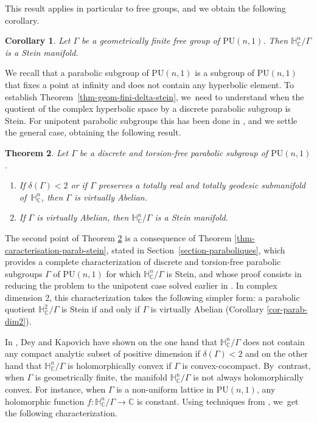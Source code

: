 \documentclass[JEP,XML,SOM,Unicode,NoEqCountersInSection,published]{cedram}
\newenvironment{enumeratea}
{\bgroup\def\theenumi{\alph{enumi}}
\begin{enumerate}}
{\end{enumerate}\egroup}
\newtheorem{theoremIntro}{Theorem}
\newtheorem{corollaryIntro}[theoremIntro]{Corollary}
\theoremstyle{definition}
\newcommand{\C}{\mathbb{C}}
\newcommand{\HNC}{\mathbb{H}^{n}_{\C}}
\newcommand{\PU}{\mathrm{PU}}
\def\C{\mathbb{C}}
\newcommand{\HNC}{\mathbb{H}^{n}_{\C}}
\newcommand{\PU}{\mathrm{PU}}
\begin{document}
This result applies in particular to free groups, and we obtain the following corollary.
\begin{corollaryIntro}\label{cor-free}
Let $\Gamma$ be a geometrically finite free group of $\PU(n,1)$. Then $\HNC/\Gamma$ is a Stein manifold.
\end{corollaryIntro}

We recall that a parabolic subgroup of $\PU(n,1)$ is a subgroup of $\PU(n,1)$ that fixes a point at infinity and does not contain any hyperbolic element. To establish Theorem~\ref{thm-geom-fini-delta-stein}, we~need to understand when the quotient
of the complex hyperbolic space by a discrete parabolic subgroup is Stein. For unipotent parabolic subgroups this has been done in \cite{miebachQuotientsBoundedHomogeneous2024}, and we settle the general case, obtaining the following result.
\begin{theoremIntro}\label{thm-parabolique-abelien-delta-stein}
Let $\Gamma$ be a discrete and torsion-free parabolic subgroup of $\PU(n,1)$.
\begin{enumeratea}
\item\label{thm-parabolique-abelien-delta-steina} If $\delta(\Gamma)<2$ or if $\Gamma$ preserves a totally real and totally geodesic submanifold of~$\HNC$, then $\Gamma$ is virtually Abelian.
\item\label{thm-parabolique-abelien-delta-steinb} If $\Gamma$ is virtually Abelian, then $\HNC/\Gamma$ is a Stein manifold.
\end{enumeratea}
\end{theoremIntro}

The second point of Theorem \ref{thm-parabolique-abelien-delta-stein} is a consequence of Theorem \ref{thm-caracterisation-parab-stein}, stated in Section~\ref{section-paraboliques}, which provides a complete characterization of discrete and torsion-free parabolic subgroups $\Gamma$ of $\PU(n,1)$ for which $\HNC/\Gamma$ is Stein, and whose proof consists in reducing the problem to the unipotent case solved earlier in \cite{miebachQuotientsBoundedHomogeneous2024}. In complex dimension 2, this characterization takes the following simpler form: a parabolic quotient $\mathbb{H}^{2}_{\C}/\Gamma$ is Stein if and only if $\Gamma$ is virtually Abelian (Corollary \ref{cor-parab-dim2}).

In \cite{deyNoteComplexhyperbolicKleinian2020}, Dey and Kapovich have shown on the one hand that $\HNC/\Gamma$ does not contain any compact analytic subset of positive dimension if $\delta(\Gamma)<2$ and on the other hand that $\HNC/\Gamma$ is holomorphically convex if $\Gamma$ is convex-cocompact. By~contrast, when $\Gamma$ is geometrically finite, the manifold $\HNC/\Gamma$ is not always holomorphically convex. For instance, when $\Gamma$ is a non-uniform lattice in $\PU(n,1)$, any holomorphic function $f:\HNC/\Gamma\to \C$ is constant. Using techniques from \cite{chenDiscreteGroupsHolomorphic2013}, we~get the following characterization.
\end{document}
